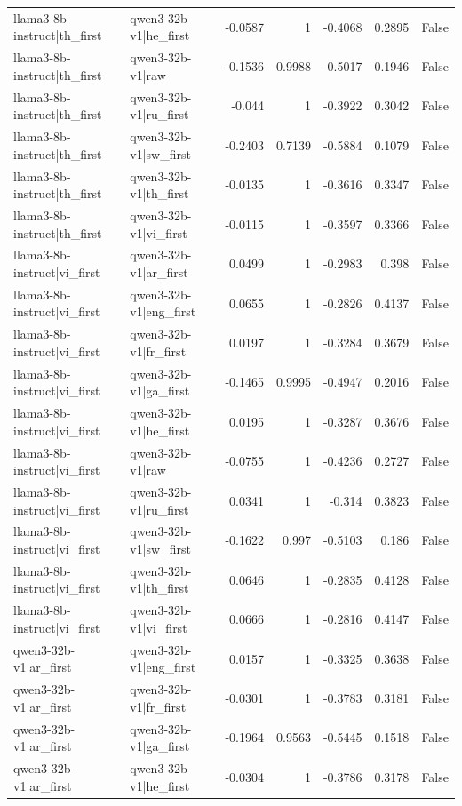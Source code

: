 \begin{table}
\begin{tabular}{l l r r r r l}
llama3-8b-instruct|th_first & qwen3-32b-v1|he_first & -0.0587 & 1 & -0.4068 & 0.2895 & False \\
llama3-8b-instruct|th_first & qwen3-32b-v1|raw & -0.1536 & 0.9988 & -0.5017 & 0.1946 & False \\
llama3-8b-instruct|th_first & qwen3-32b-v1|ru_first & -0.044 & 1 & -0.3922 & 0.3042 & False \\
llama3-8b-instruct|th_first & qwen3-32b-v1|sw_first & -0.2403 & 0.7139 & -0.5884 & 0.1079 & False \\
llama3-8b-instruct|th_first & qwen3-32b-v1|th_first & -0.0135 & 1 & -0.3616 & 0.3347 & False \\
llama3-8b-instruct|th_first & qwen3-32b-v1|vi_first & -0.0115 & 1 & -0.3597 & 0.3366 & False \\
llama3-8b-instruct|vi_first & qwen3-32b-v1|ar_first & 0.0499 & 1 & -0.2983 & 0.398 & False \\
llama3-8b-instruct|vi_first & qwen3-32b-v1|eng_first & 0.0655 & 1 & -0.2826 & 0.4137 & False \\
llama3-8b-instruct|vi_first & qwen3-32b-v1|fr_first & 0.0197 & 1 & -0.3284 & 0.3679 & False \\
llama3-8b-instruct|vi_first & qwen3-32b-v1|ga_first & -0.1465 & 0.9995 & -0.4947 & 0.2016 & False \\
llama3-8b-instruct|vi_first & qwen3-32b-v1|he_first & 0.0195 & 1 & -0.3287 & 0.3676 & False \\
llama3-8b-instruct|vi_first & qwen3-32b-v1|raw & -0.0755 & 1 & -0.4236 & 0.2727 & False \\
llama3-8b-instruct|vi_first & qwen3-32b-v1|ru_first & 0.0341 & 1 & -0.314 & 0.3823 & False \\
llama3-8b-instruct|vi_first & qwen3-32b-v1|sw_first & -0.1622 & 0.997 & -0.5103 & 0.186 & False \\
llama3-8b-instruct|vi_first & qwen3-32b-v1|th_first & 0.0646 & 1 & -0.2835 & 0.4128 & False \\
llama3-8b-instruct|vi_first & qwen3-32b-v1|vi_first & 0.0666 & 1 & -0.2816 & 0.4147 & False \\
qwen3-32b-v1|ar_first & qwen3-32b-v1|eng_first & 0.0157 & 1 & -0.3325 & 0.3638 & False \\
qwen3-32b-v1|ar_first & qwen3-32b-v1|fr_first & -0.0301 & 1 & -0.3783 & 0.3181 & False \\
qwen3-32b-v1|ar_first & qwen3-32b-v1|ga_first & -0.1964 & 0.9563 & -0.5445 & 0.1518 & False \\
qwen3-32b-v1|ar_first & qwen3-32b-v1|he_first & -0.0304 & 1 & -0.3786 & 0.3178 & False \\

\end{tabular}
\end{table}
